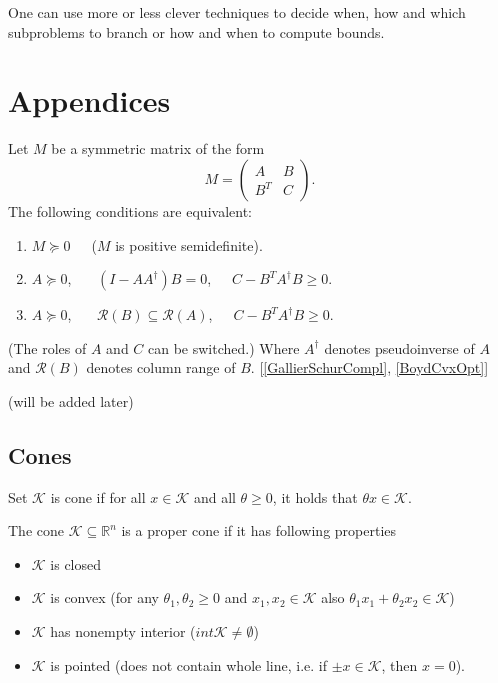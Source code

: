 \documentclass[10pt,oneside]{book}
\theoremstyle{definition}
\begin{document}
One can use more or less clever techniques to decide when, how and which subproblems to branch or how and when to compute bounds.



\chapter{Appendices}

\label{SchurCompl}
Let $M$ be a symmetric matrix of the form
$$M = \left(\begin{array}{cc}
A & B\\
B^T & C
\end{array}\right).$$ 
The following conditions are equivalent:
\begin{enumerate}
\item $M\succeq 0$\ \ \ ($M$ is positive semidefinite).
\item $A\succeq 0$, \ \ \ $(I-AA^\dagger)B = 0$,\ \ \ $C - B^TA^\dagger B \geq 0$.
\item $A\succeq 0$, \ \ \ $\mathcal{R}(B)\subseteq \mathcal{R}(A)$,\ \ \ $C - B^TA^\dagger B \geq 0$.
\end{enumerate}
(The roles of $A$ and $C$ can be switched.)
Where $A^\dagger$ denotes pseudoinverse of $A$ and $\mathcal{R}(B)$ denotes column range of $B$. \rm [\ref{GallierSchurCompl}, \ref{BoydCvxOpt}]

\proof (will be added later)


\section{Cones}

\label{defCone}
Set $\mathcal{K}$ is cone if for all $x\in \mathcal{K}$ and all $\theta\geq 0$, it holds that $\theta x \in \mathcal{K}$.

\label{defProperCone}
The cone $\mathcal{K}\subseteq \mathbb{R}^n$ is a proper cone if it has following properties
\begin{itemize}
\item $\mathcal{K}$ is closed
\item $\mathcal{K}$ is convex (for any $\theta_1,\theta_2\geq 0$ and $x_1,x_2\in\mathcal{K}$ also $\theta_1x_1 + \theta_2x_2 \in\mathcal{K}$)
\item $\mathcal{K}$ has nonempty interior  ($int \mathcal{K} \neq \emptyset$)
\item $\mathcal{K}$ is pointed (does not contain whole line, i.e. if $\pm x\in \mathcal{K}$, then $x=0$).
\end{itemize}
\end{document}
